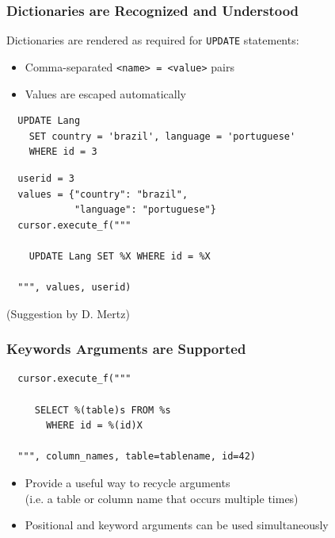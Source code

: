 \documentclass{beamer}
\begin{document}
\begin{frame}[fragile]
  \frametitle{Dictionaries are Recognized and Understood}

  Dictionaries are rendered as required for \texttt{UPDATE} statements:
  \begin{itemize}
  \item Comma-separated \texttt{<name> = <value>} pairs
  \item Values are escaped automatically
  \end{itemize}

\begin{verbatim}
  UPDATE Lang
    SET country = 'brazil', language = 'portuguese'
    WHERE id = 3
\end{verbatim}
\vfill

\begin{verbatim}
  userid = 3
  values = {"country": "brazil",
            "language": "portuguese"}
  cursor.execute_f("""

    UPDATE Lang SET %X WHERE id = %X

  """, values, userid)
\end{verbatim}

\vfill

(Suggestion by D. Mertz)

\end{frame}


\begin{frame}[fragile]
  \frametitle{Keywords Arguments are Supported}

\begin{verbatim}
  cursor.execute_f("""

     SELECT %(table)s FROM %s
       WHERE id = %(id)X

  """, column_names, table=tablename, id=42)
\end{verbatim}

\begin{itemize}
\item Provide a useful way to recycle arguments \\
(i.e. a table or column name that occurs multiple times)

\item Positional and keyword arguments can be used simultaneously
\end{itemize}

\end{frame}
\end{document}
